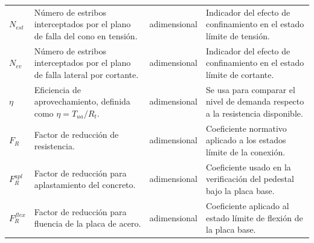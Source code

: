 \begin{longtable}{p{} p{} p{} p{}}
$N_{est}$ & Número de estribos interceptados por el plano de falla del cono en tensión. & adimensional & Indicador del efecto de confinamiento en el estado límite de tensión. \\
$N_{ev}$ & Número de estribos interceptados por el plano de falla lateral por cortante. & adimensional & Indicador del efecto de confinamiento en el estado límite de cortante. \\
$\eta$ & Eficiencia de aprovechamiento, definida como $\eta = T_{ua}/R_t$. & adimensional & Se usa para comparar el nivel de demanda respecto a la resistencia disponible. \\
$F_R$ & Factor de reducción de resistencia. & adimensional & Coeficiente normativo aplicado a los estados límite de la conexión. \\
$F_R^{apl}$ & Factor de reducción para aplastamiento del concreto. & adimensional & Coeficiente usado en la verificación del pedestal bajo la placa base. \\
$F_R^{flex}$ & Factor de reducción para fluencia de la placa de acero. & adimensional & Coeficiente aplicado al estado límite de flexión de la placa base. \\
\end{longtable}
\normalsize
